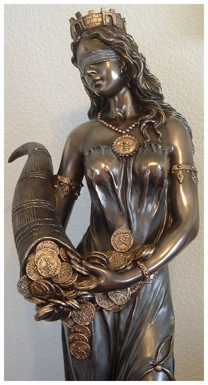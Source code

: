 \documentclass[9pt]{beamer}
\begin{document}
\begin{frame}[fragile,t]
\begin{center}
    \includegraphics[scale=0.25]{./figs/Tyche2.jpg}
  \end{center}
\end{frame}
\end{document}
